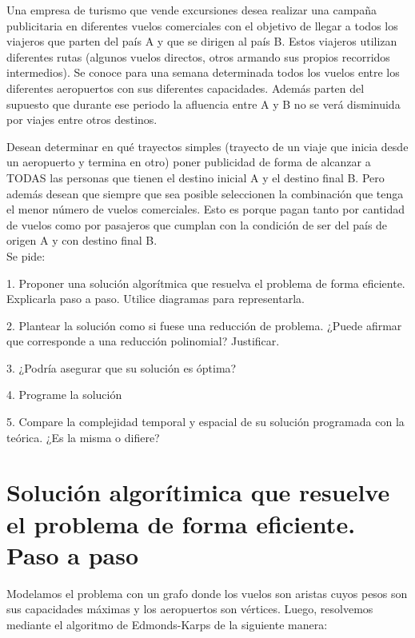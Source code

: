 
Una empresa de turismo que vende excursiones desea realizar una campaña publicitaria en diferentes vuelos comerciales con el objetivo de llegar a todos los viajeros que parten del país A y que se dirigen al país B. Estos viajeros utilizan diferentes rutas (algunos vuelos directos, otros armando sus propios recorridos intermedios). Se conoce para una semana determinada todos los vuelos entre los diferentes aeropuertos con sus diferentes capacidades. Además parten del supuesto que durante ese periodo la afluencia entre A y B no se verá disminuida por viajes entre otros destinos.

Desean determinar en qué trayectos simples (trayecto de un viaje que inicia desde un aeropuerto y termina en otro) poner publicidad de forma de alcanzar a TODAS las personas que tienen el destino inicial A y el destino final B. Pero además desean que siempre que sea posible seleccionen la combinación que tenga el menor número de vuelos comerciales. Esto es porque pagan tanto por cantidad de vuelos como por pasajeros que cumplan con la condición de ser del país de origen A y con destino final B. \\

Se pide:

1. Proponer una solución algorítmica que resuelva el problema de forma eficiente. Explicarla paso a paso. Utilice diagramas para representarla.

2. Plantear la solución como si fuese una reducción de problema. ¿Puede afirmar que corresponde a una reducción polinomial? Justificar.

3. ¿Podría asegurar que su solución es óptima?

4. Programe la solución

5. Compare la complejidad temporal y espacial de su solución programada con la teórica. ¿Es la misma o difiere? \\

\section{Solución algorítimica que resuelve el problema de forma eficiente. Paso a paso} Modelamos el problema con un grafo donde los vuelos son aristas cuyos pesos son sus capacidades máximas y los aeropuertos son vértices. Luego, resolvemos mediante el algoritmo de Edmonds-Karps de la siguiente manera: \\



